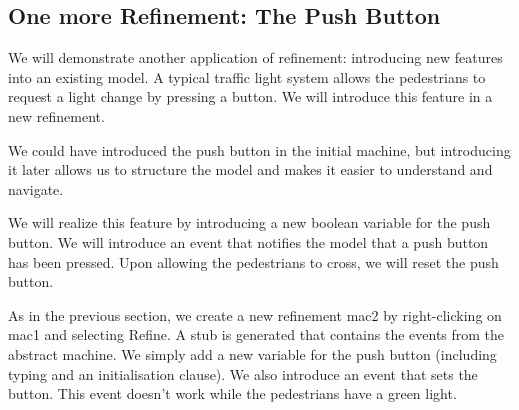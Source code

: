 {\begin{description}
\begin{description}
\begin{description}
			\end{description}
		\Witnesses
			\begin{description}
			\end{description}
		\ThenAct
			\begin{description}
			\nItemX{ act1 }{ cars\_colors :=  new\_value\_colors }
			\end{description}
		\EndAct
		\end{description}
\END
\end{description}
}

\subsection{One more Refinement: The Push Button}
\label{tut_one_more_refinement}

We will demonstrate another application of refinement: introducing new features into an existing model.  A typical traffic light system allows the pedestrians to request a light change by pressing a button.  We will introduce this feature in a new refinement.

We could have introduced the push button in the initial machine, but introducing it later allows us to structure the model and makes it easier to understand and navigate.

We will realize this feature by introducing a new boolean variable for the push button.  We will introduce an event that notifies the model that a push button has been pressed.  Upon allowing the pedestrians to cross, we will reset the push button.

As in the previous section, we create a new refinement \textsf{mac2} by right-clicking on \textsf{mac1} and selecting \textsf{Refine}.  A stub is generated that contains the events from the abstract machine.  We simply add a new variable for the push button (including typing and an initialisation clause).  We also introduce an event that sets the button.  This event doesn't work while the pedestrians have a green light.

